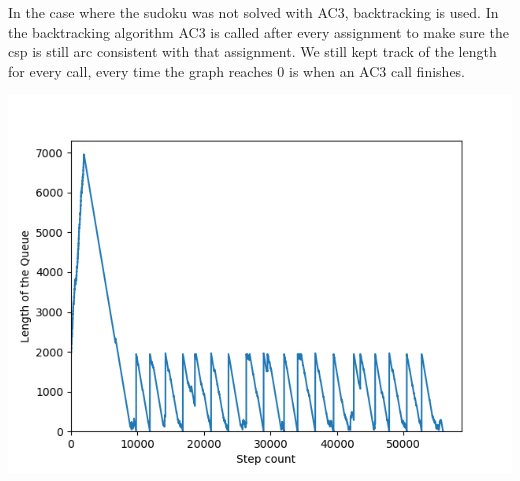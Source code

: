 \documentclass{article}
\begin{document}
In the case where the sudoku was not solved with AC3, backtracking is used. In the backtracking algorithm AC3 is called after every assignment to make sure the csp is still arc consistent with that assignment. We still kept track of the length for every call, every time the graph reaches 0 is when an AC3 call finishes.

\includegraphics[scale=0.6]{Sudoku-Queue-length-plot-10.png}

\newpage
\end{document}
